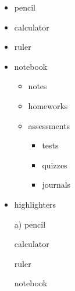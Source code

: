 \documentclass[11pt]{article}
\begin{document}
\vspace{1cm}

\begin{itemize}
\item pencil
\item calculator
\item ruler
\item notebook
	
	\begin{itemize}
	\item notes
	\item homeworks
	\item assessments
		
		\begin{itemize}
		\item tests
		\item quizzes
		\item journals
		\end{itemize}			
	\end{itemize}
\item highlighters
\end{itemize}

\vspace{1cm}

\begin{enumerate}
\item[a)] pencil
\item[] calculator
\item[] ruler
\item[] notebook
\end{enumerate}
\end{document}
